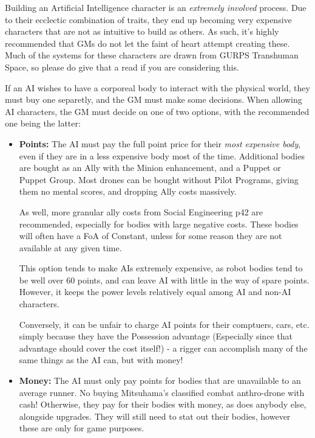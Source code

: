 \begin{multicols*}{3}
	Building an Artificial Intelligence character is an \textit{extremely involved} process. Due to their ecclectic combination of traits, they end up becoming very expensive characters that are not as intuitive to build as others. As such, it's highly recommended that GMs do not let the faint of heart attempt creating these. Much of the systems for these characters are drawn from GURPS Transhuman Space, so please do give that a read if you are considering this.
	
	If an AI wishes to have a corporeal body to interact with the physical world, they must buy one separetly, and the GM must make some decisions. When allowing AI characters, the GM must decide on one of two options, with the recommended one being the latter:
	\begin{itemize}
		\item \textbf{Points: } The AI must pay the full point price for their \textit{most expensive body}, even if they are in a less expensive body most of the time. Additional bodies are bought as an Ally with the Minion enhancement, and a Puppet or Puppet Group. Most drones can be bought without Pilot Programs, giving them no mental scores, and dropping Ally costs massively. 
		
		As well, more granular ally costs from Social Engineering p42 are recommended, especially for bodies with large negative costs. These bodies will often have a FoA of Constant, unless for some reason they are not available at any given time. 
		
		This option tends to make AIs extremely expensive, as robot bodies tend to be well over 60 points, and can leave AI with little in the way of spare points. However, it keeps the power levels relatively equal among AI and non-AI characters. 
		
		Conversely, it can be unfair to charge AI points for their comptuers, cars, etc. simply because they have the Possession advantage (Especially since that advantage should cover the cost itself!) - a rigger can accomplish many of the same things as the AI can, but with money!
		
		\item \textbf{Money: } The AI must only pay points for bodies that are unavailable to an average runner. No buying Mitsuhama's classified combat anthro-drone with cash! Otherwise, they pay for their bodies with money, as does anybody else, alongside upgrades. They will still need to stat out their bodies, however these are only for game purposes. 
		

\end{itemize}
\end{multicols*}
